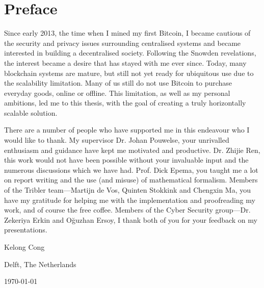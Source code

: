 \chapter*{Preface}
Since early 2013, the time when I mined my first Bitcoin, 
I became cautious of the security and privacy issues surrounding centralised systems
and became interested in building a decentralised society.
Following the Snowden revelations, the interest became a desire that has stayed with me ever since.
Today, many blockchain systems are mature, but still not yet ready for ubiquitous use due to the scalability limitation.
Many of us still do not use Bitcoin to purchase everyday goods, online or offline.
This limitation, as well as my personal ambitions, led me to this thesis,
with the goal of creating a truly horizontally scalable solution.

\vspace{1\baselineskip}

\noindent
There are a number of people who have supported me in this endeavour who I would like to thank.
My supervisor Dr. Johan Pouwelse, your unrivalled enthusiasm and guidance have kept me motivated and productive.
Dr. Zhijie Ren, this work would not have been possible without your invaluable input and the numerous discussions which we have had.
Prof. Dick Epema, you taught me a lot on report writing and the use (and misuse) of mathematical formalism.
Members of the Tribler team---Martijn de Vos, Quinten Stokkink and Chengxin Ma,
you have my gratitude for helping me with the implementation and proofreading my work,
and of course the free coffee.
Members of the Cyber Security group---Dr. Zekeriya Erkin and O\u{g}uzhan Ersoy,
I thank both of you for your feedback on my presentations.

\vspace{1\baselineskip}

\noindent
Kelong Cong

\vspace{1\baselineskip}

\noindent
Delft, The Netherlands

\noindent
\today
